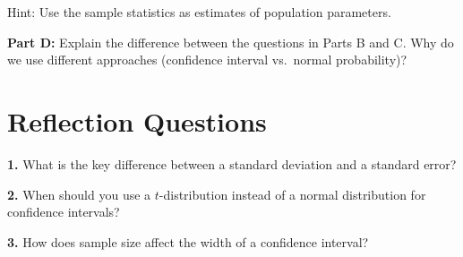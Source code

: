 \documentclass[11pt]{article}
\begin{document}
\vspace{0.3cm}

Hint: Use the sample statistics as estimates of population parameters.

\vspace{4cm}

\textbf{Part D:} Explain the difference between the questions in Parts B and C. Why do we use different approaches (confidence interval vs.\ normal probability)?

\vspace{3.5cm}

\vspace{1cm}

\section*{Reflection Questions}

\textbf{1.} What is the key difference between a standard deviation and a standard error?

\vspace{2cm}

\textbf{2.} When should you use a $t$-distribution instead of a normal distribution for confidence intervals?

\vspace{2cm}

\textbf{3.} How does sample size affect the width of a confidence interval?

\vspace{2cm}
\end{document}
